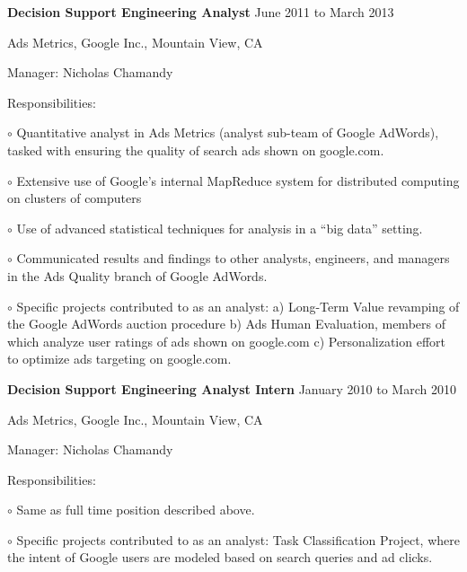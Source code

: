 \documentclass[10pt]{article}
\newcommand{\halfblankline}{\quad\vspace{-0.5\baselineskip}\pagebreak[3]}
\begin{document}
\textbf{Decision Support Engineering Analyst} \hfill {June 2011 to March 2013}
\begin{outerlist}
    \item[] Ads Metrics, Google Inc., Mountain View, CA
    \begin{innerlist}
        \item Manager: Nicholas Chamandy
        \item Responsibilities:
            \begin{innerlist}
			\item[$\circ$] Quantitative analyst in Ads Metrics (analyst sub-team
			of Google AdWords), tasked with ensuring the quality of search
			ads shown on google.com.
			\item[$\circ$] Extensive use of Google's internal MapReduce system
			for distributed computing on clusters of computers
			\item[$\circ$] Use of advanced statistical techniques for analysis
			in a ``big data'' setting.
			\item[$\circ$] Communicated results and findings to other analysts,
			engineers, and managers in the Ads Quality branch of Google AdWords.
			\item[$\circ$] Specific projects contributed to as an analyst:
			a) Long-Term Value revamping of the Google AdWords auction
			procedure b) Ads Human Evaluation, members of which analyze user
			ratings of ads shown on google.com c) Personalization effort to
			optimize ads targeting on google.com.
            \end{innerlist}
    \end{innerlist}
\end{outerlist}

\halfblankline

\textbf{Decision Support Engineering Analyst Intern} \hfill {January 2010 to March 2010}
\begin{outerlist}
    \item[] Ads Metrics, Google Inc., Mountain View, CA
    \begin{innerlist}
        \item Manager: Nicholas Chamandy
        \item Responsibilities:
            \begin{innerlist}
			\item[$\circ$] Same as full time position described above.
			\item[$\circ$] Specific projects contributed to as an analyst: Task
			Classification Project, where the intent of Google users are modeled
			based on search queries and ad clicks.
            \end{innerlist}
    \end{innerlist}
\end{outerlist}
\end{document}
